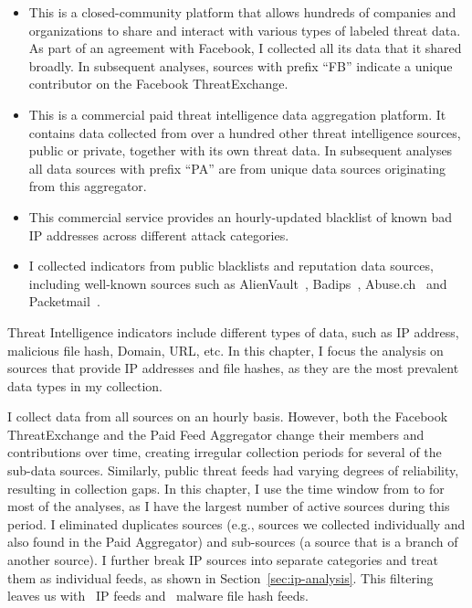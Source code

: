 \begin{itemize}
\item {}
    This is a closed-community platform that allows hundreds of companies and
    organizations to share and interact with various types of labeled threat data.
    As part of an agreement with Facebook, I collected all its data that it shared broadly.
    In subsequent analyses, sources with
    prefix ``FB'' indicate a unique contributor on the Facebook ThreatExchange.

\item {} This is a commercial paid threat intelligence data aggregation
    platform. It contains data collected from over a hundred other
    threat intelligence sources, public or private, together with its own threat data.
    In subsequent analyses all data sources with prefix ``PA''
    are from unique data sources originating from this aggregator.

\item {} This commercial service provides an
    hourly-updated blacklist of known bad IP addresses across different attack categories.

\item {} I collected indicators from public
    blacklists and reputation data sources, including well-known
    sources such as AlienVault~\cite{Alienvault}, Badips~\cite{Badips}, Abuse.ch~\cite{Abuse-ch}
    and Packetmail~\cite{Packetmail}.
\end{itemize}

Threat Intelligence indicators include different types of data, such as IP address, malicious file hash, Domain,
URL, etc. In this chapter, I focus the analysis on sources that provide IP addresses and file hashes,
as they are the most prevalent data types in my collection.

I collect data from all sources on an hourly basis. However, both the Facebook
ThreatExchange and the Paid Feed Aggregator change their members and contributions
over time, creating irregular collection periods for several of the sub-data sources.
Similarly, public threat feeds had varying degrees of reliability, resulting in
collection gaps. In this chapter, I use the time window from 
to  for most of the analyses, as I have the largest number
of active sources during this period. I eliminated duplicates sources (e.g., sources
we collected individually and also found in the {Paid Aggregator}) and
sub-sources (a source that is a branch of another source). I further break IP
sources into separate categories and treat them as individual feeds, as shown in
Section~\ref{sec:ip-analysis}. This filtering leaves us with \numipfeeds\ IP feeds and
\numhashfeeds\ malware file hash feeds.

